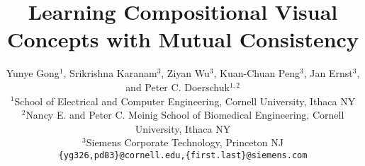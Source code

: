 \documentclass[10pt,twocolumn,letterpaper]{article}
\begin{document}
\title{Learning Compositional Visual Concepts with Mutual Consistency}

\author{Yunye Gong$^{1}$, Srikrishna Karanam$^{3}$, Ziyan Wu$^{3}$, Kuan-Chuan Peng$^{3}$, Jan Ernst$^{3}$, and Peter C. Doerschuk$^{1,2}$\\
$^{1}$School of Electrical and Computer Engineering, Cornell University, Ithaca NY\\
$^{2}$Nancy E. and Peter C. Meinig School of Biomedical Engineering, Cornell University, Ithaca NY\\
$^{3}$Siemens Corporate Technology, Princeton NJ\\
{\tt\small \{yg326,pd83\}@cornell.edu,\{first.last\}@siemens.com}
}


\end{document}
